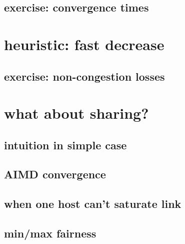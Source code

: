 \subsection{exercise: convergence times}


\section{heuristic: fast decrease}



\subsection{exercise: non-congestion losses}



\section{what about sharing?}


\subsection{intuition in simple case}


\subsection{AIMD convergence}


\subsection{when one host can't saturate link}


\subsection{min/max fairness}



